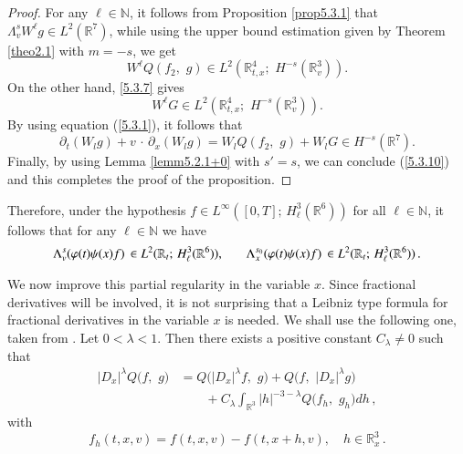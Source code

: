 \documentclass{amsart}[12pt, article]
\begin{document}
\begin{proof} For any $\ell\in{{\mathbb N}}$, it follows {}from
Proposition \ref{prop5.3.1} that $
\Lambda^s_v W^\ell g \in L^2({{{\mathbb R}}}^7)$, while using the upper bound estimation given by Theorem \ref{theo2.1} with
$m=-s$, we get
$$
W^\ell Q( f_2,\,\, g)\in L^2({{{\mathbb R}}}^4_{t, x};\,\, H^{-s}({{{\mathbb R}}}^3_v)).
$$
On the other hand, \eqref{5.3.7} gives
$$
W^\ell G\in L^2({{{\mathbb R}}}^4_{t, x};\,\, H^{-s}({{{\mathbb R}}}^3_v)).
$$
By using equation (\ref{5.3.1}), it follows that
\begin{equation*}\label{5.3.11}
\partial_t(W_l g) + v\,\cdot\,\partial_x {(W_l g )} =W_l Q(f_2,\,\, g)+
W_l G \in H^{-s}({{{\mathbb R}}}^7).
\end{equation*}
Finally, by using Lemma \ref{lemm5.2.1+0} with $s'=s$, we can
conclude (\ref{5.3.10}) and this completes the proof of the
proposition.
\end{proof}

Therefore,  under the hypothesis $f\in L^\infty([0, T];\, H^3_\ell
({{{\mathbb R}}}^6))$ for all $\ell  \in{{\mathbb N}}$, it follows that for any $ \ell
\in{{\mathbb N}}$ we have
\begin{equation}\label{5.3.12}
\Lambda^{s}_{v}(\varphi(t)\psi(x) f) \, \in L^2({{{\mathbb R}}}_t;\, H^3_\ell
({{{\mathbb R}}}^6)),\,\, \hskip 0.5cm \Lambda^{s_0}_{x}(\varphi(t)\psi(x) f) \,
\in L^2({{{\mathbb R}}}_t;\, H^3_\ell  ({{{\mathbb R}}}^6))\, .
\end{equation}

\smallbreak We now improve this partial regularity in the variable $x$. Since fractional derivatives will be involved, it is not surprising that a Leibniz type formula for fractional derivatives in the variable $x$ is needed. We shall use the following one, taken {}from \cite{amuxy-nonlinear-3}.
Let $0<\lambda<1$.
Then there exists a positive constant $C_\lambda\neq 0$ such that
\begin{align}\label{leibniz-x}
|D_{x}|^{\lambda}Q\big({f},\,\, g\big)&= Q\big(|D_{
x}|^{\lambda}{f},\,\, g\big)+ Q\big({f},\,\, |D_{
x}|^{\lambda}g\big)\\
&\qquad+C_\lambda\int_{{{{\mathbb R}}}^3} |h|^{-3-\lambda}Q\big(f_h,\,\,
g_h\big) d h\,,\nonumber
\end{align}
with
$$
f_h(t, x, v)={f}(t, x, v)-{f}(t, x+h, v),\,\,\,\,\,\, h\in{{{\mathbb R}}}^3_{
x}\, .
$$
\end{document}
